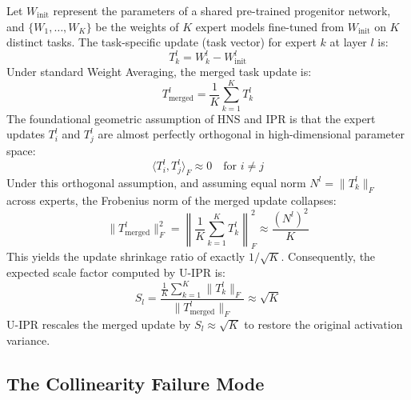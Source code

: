 \documentclass{article}
\theoremstyle{plain}
\theoremstyle{definition}
\theoremstyle{remark}
\begin{document}
Let $W_{\text{init}}$ represent the parameters of a shared pre-trained progenitor network, and $\{W_1, \dots, W_K\}$ be the weights of $K$ expert models fine-tuned from $W_{\text{init}}$ on $K$ distinct tasks. The task-specific update (task vector) for expert $k$ at layer $l$ is:
\begin{equation}
    T_k^l = W_k^l - W_{\text{init}}^l
\end{equation}
Under standard Weight Averaging, the merged task update is:
\begin{equation}
    T_{\text{merged}}^l = \frac{1}{K} \sum_{k=1}^K T_k^l
\end{equation}
The foundational geometric assumption of HNS and IPR is that the expert updates $T_i^l$ and $T_j^l$ are almost perfectly orthogonal in high-dimensional parameter space:
\begin{equation}
    \langle T_i^l, T_j^l \rangle_F \approx 0 \quad \text{for } i \neq j
\end{equation}
Under this orthogonal assumption, and assuming equal norm $N^l = \|T_k^l\|_F$ across experts, the Frobenius norm of the merged update collapses:
\begin{equation}
    \|T_{\text{merged}}^l\|_F^2 = \left\| \frac{1}{K}\sum_{k=1}^K T_k^l \right\|_F^2 \approx \frac{(N^l)^2}{K}
\end{equation}
This yields the update shrinkage ratio of exactly $1/\sqrt{K}$. Consequently, the expected scale factor computed by U-IPR is:
\begin{equation}
    S_l = \frac{\frac{1}{K}\sum_{k=1}^K \|T_k^l\|_F}{\|T_{\text{merged}}^l\|_F} \approx \sqrt{K}
\end{equation}
U-IPR rescales the merged update by $S_l \approx \sqrt{K}$ to restore the original activation variance.

\subsection{The Collinearity Failure Mode}
\end{document}
